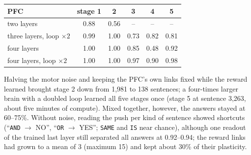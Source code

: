 \documentclass[11pt]{article}
\begin{document}
\begin{center}\small
\begin{tabular}{lccccc}
\toprule
PFC & stage 1 & 2 & 3 & 4 & 5\\
\midrule
two layers & 0.88 & 0.56 & -- & -- & --\\
three layers, loop $\times2$ & 0.99 & 1.00 & 0.73 & 0.82 & 0.81\\
four layers & 1.00 & 1.00 & 0.85 & 0.48 & 0.92\\
four layers, loop $\times2$ & 1.00 & 1.00 & 0.97 & 0.90 & 0.98\\
\bottomrule
\end{tabular}
\end{center}

Halving the motor noise and keeping the PFC's own links fixed while the reward learned brought stage 2 down from 1,981 to
138 sentences; a four-times larger brain with a doubled loop learned all five stages once (stage 5 at sentence 3,263, about
five minutes of compute). Mixed together, however, the answers stayed at 60--75\%. Without noise, reading the push per kind
of sentence showed shortcuts (``\texttt{AND} $\to$ NO'', ``\texttt{OR} $\to$ YES''; \texttt{SAME} and \texttt{IS} near chance),
although one readout of the trained last layer still separated all answers at 0.92--0.94; the reward links had grown to a
mean of 3 (maximum 15) and kept about 30\% of their plasticity.
\end{document}
